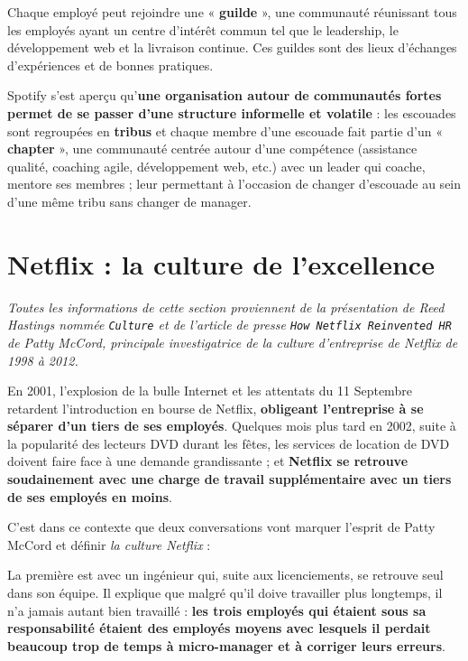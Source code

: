 Chaque employé peut rejoindre une « \textbf{guilde} », une communauté réunissant tous les employés ayant un centre d'intérêt commun tel que le leadership, le  développement web et la livraison continue. Ces guildes sont des lieux d'échanges d'expériences et de bonnes pratiques.

Spotify s'est aperçu qu'\textbf{une organisation autour de communautés fortes permet de se passer d'une structure informelle et volatile} : les escouades sont regroupées en \textbf{tribus} et chaque membre d'une escouade fait partie d'un « \textbf{chapter} », une communauté centrée autour d'une compétence (assistance qualité, coaching agile, développement web, etc.) avec un leader qui coache, mentore ses membres ; leur permettant à l'occasion de changer d'escouade au sein d'une même tribu sans changer de manager.

\section{Netflix : la culture de l'excellence }

\textit{Toutes les informations de cette section proviennent de la présentation de Reed Hastings nommée \texttt{Culture}\supercite{NetflixCultureBook} et de l'article de presse \texttt{How Netflix Reinvented HR}\supercite{NetflixReinventedHR} de Patty McCord, principale investigatrice de la culture d'entreprise de Netflix de 1998 à 2012.} 

\vspace{5mm}

En 2001, l'explosion de la bulle Internet et les attentats du 11 Septembre retardent l'introduction en bourse de Netflix, \textbf{obligeant l'entreprise à se séparer d'un tiers de ses employés}. Quelques mois plus tard en 2002, suite à la popularité des lecteurs DVD durant les fêtes, les services de location de DVD doivent faire face à une demande grandissante ; et \textbf{Netflix se retrouve soudainement avec une charge de travail supplémentaire avec un tiers de ses employés en moins}.

\vspace{5mm}

C'est dans ce contexte que deux conversations vont marquer l'esprit de Patty McCord et définir \textit{la culture Netflix} :

La première est avec un ingénieur qui, suite aux licenciements, se retrouve seul dans son équipe. Il explique que malgré qu'il doive travailler plus longtemps, il n'a jamais autant bien travaillé : \textbf{les trois employés qui étaient sous sa responsabilité étaient des employés moyens avec lesquels il perdait beaucoup trop de temps à micro-manager et à corriger leurs erreurs}.

